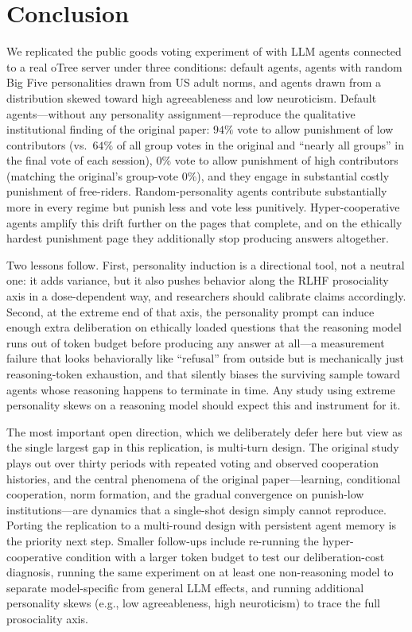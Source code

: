 \documentclass[12pt, a4paper]{article}
\begin{document}
\section{Conclusion}

We replicated the public goods voting experiment of \citet{ertan2009who} with LLM agents connected to a real oTree server under three conditions: default agents, agents with random Big Five personalities drawn from US adult norms, and agents drawn from a distribution skewed toward high agreeableness and low neuroticism. Default agents---without any personality assignment---reproduce the qualitative institutional finding of the original paper: $94\%$ vote to allow punishment of low contributors (vs.\ $64\%$ of all group votes in the original and ``nearly all groups'' in the final vote of each session), $0\%$ vote to allow punishment of high contributors (matching the original's group-vote $0\%$), and they engage in substantial costly punishment of free-riders. Random-personality agents contribute substantially more in every regime but punish less and vote less punitively. Hyper-cooperative agents amplify this drift further on the pages that complete, and on the ethically hardest punishment page they additionally stop producing answers altogether.

Two lessons follow. First, personality induction is a directional tool, not a neutral one: it adds variance, but it also pushes behavior along the RLHF prosociality axis in a dose-dependent way, and researchers should calibrate claims accordingly. Second, at the extreme end of that axis, the personality prompt can induce enough extra deliberation on ethically loaded questions that the reasoning model runs out of token budget before producing any answer at all---a measurement failure that looks behaviorally like ``refusal'' from outside but is mechanically just reasoning-token exhaustion, and that silently biases the surviving sample toward agents whose reasoning happens to terminate in time. Any study using extreme personality skews on a reasoning model should expect this and instrument for it.

The most important open direction, which we deliberately defer here but view as the single largest gap in this replication, is multi-turn design. The original \citet{ertan2009who} study plays out over thirty periods with repeated voting and observed cooperation histories, and the central phenomena of the original paper---learning, conditional cooperation, norm formation, and the gradual convergence on punish-low institutions---are dynamics that a single-shot design simply cannot reproduce. Porting the replication to a multi-round design with persistent agent memory is the priority next step. Smaller follow-ups include re-running the hyper-cooperative condition with a larger token budget to test our deliberation-cost diagnosis, running the same experiment on at least one non-reasoning model to separate model-specific from general LLM effects, and running additional personality skews (e.g., low agreeableness, high neuroticism) to trace the full prosociality axis.
\end{document}
